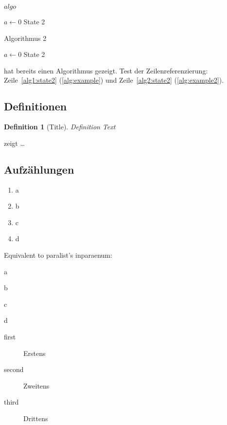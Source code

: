 \documentclass[
  fontsize=10pt,
  numbers=noenddot,
  english,  %
  paper=a5,
  twoside,  %
  DIV=calc,
  headings=small,
  bibliography=totoc,
  listof=totoc,
  draft=false
]{scrbook}
\theoremstyle{break}
\newtheorem{definition}{Definition}[chapter]
\begin{document}
\begin{algorithm}
  \caption{$algo$}
  \label{alg:example}
  \begin{algorithmic}[1]
    \State $a \gets 0$
    \State State 2\label{alg1:state2}
  \end{algorithmic}
\end{algorithm}

\begin{algorithm}
  \caption{Algorithmus 2}
  \label{alg:example2}
  \begin{algorithmic}[1]
    \State $a \gets 0$
    \State State 2\label{alg2:state2}
  \end{algorithmic}
\end{algorithm}

 hat bereits einen Algorithmus gezeigt.
Test der Zeilenreferenzierung: Zeile~\ref{alg1:state2} (\cref{alg:example}) und Zeile~\ref{alg2:state2} (\cref{alg:example2}).

\subsection{Definitionen}
\begin{definition}[Title]
  \label{def:def1}
  Definition Text
\end{definition}

 zeigt \ldots

\subsection{Aufzählungen}

\begin{enumerate}[label=\alph*)]
  \item a
  \item b
  \item c
  \item d
\end{enumerate}

Equivalent to paralist's inparaenum:
\begin{enumerate*}[label=\alph*)]
  \item a
  \item b
  \item c
  \item d
\end{enumerate*}

\begin{description}
  \item[first] Erstens
  \item[second] Zweitens
  \item[third] Drittens
\end{description}
\end{document}
